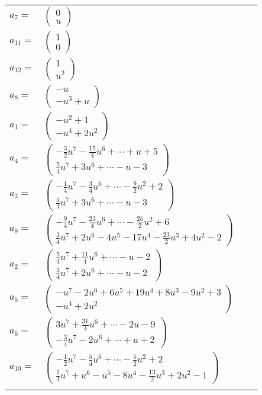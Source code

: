 \documentclass[1p]{elsarticle_modified}
\theoremstyle{definition}
\begin{document}
\begin{tabular}{m{7pt} m{180pt} m{7pt} m{180pt} }
\flushright $a_{7}=$&$\begin{pmatrix}0\\u\end{pmatrix}$ \\
\flushright $a_{11}=$&$\begin{pmatrix}1\\0\end{pmatrix}$ \\
\flushright $a_{12}=$&$\begin{pmatrix}1\\u^2\end{pmatrix}$ \\
\flushright $a_{8}=$&$\begin{pmatrix}- u\\- u^3+u\end{pmatrix}$ \\
\flushright $a_{1}=$&$\begin{pmatrix}- u^2+1\\- u^4+2 u^2\end{pmatrix}$ \\
\flushright $a_{4}=$&$\begin{pmatrix}-\frac{3}{2} u^7-\frac{15}{4} u^6+\cdots+u+5\\\frac{5}{4} u^7+3 u^6+\cdots- u-3\end{pmatrix}$ \\
\flushright $a_{3}=$&$\begin{pmatrix}-\frac{1}{4} u^7-\frac{3}{4} u^6+\cdots-\frac{9}{2} u^2+2\\\frac{5}{4} u^7+3 u^6+\cdots- u-3\end{pmatrix}$ \\
\flushright $a_{9}=$&$\begin{pmatrix}-\frac{9}{4} u^7-\frac{23}{4} u^6+\cdots-\frac{25}{2} u^2+6\\\frac{3}{4} u^7+2 u^6-4 u^5-17 u^4-\frac{23}{2} u^3+4 u^2-2\end{pmatrix}$ \\
\flushright $a_{2}=$&$\begin{pmatrix}\frac{5}{4} u^7+\frac{11}{4} u^6+\cdots- u-2\\\frac{3}{4} u^7+2 u^6+\cdots- u-2\end{pmatrix}$ \\
\flushright $a_{5}=$&$\begin{pmatrix}- u^7-2 u^6+6 u^5+19 u^4+8 u^3-9 u^2+3\\- u^4+2 u^2\end{pmatrix}$ \\
\flushright $a_{6}=$&$\begin{pmatrix}3 u^7+\frac{31}{4} u^6+\cdots-2 u-9\\-\frac{3}{4} u^7-2 u^6+\cdots+u+2\end{pmatrix}$ \\
\flushright $a_{10}=$&$\begin{pmatrix}-\frac{1}{2} u^7-\frac{5}{4} u^6+\cdots-\frac{5}{2} u^2+2\\\frac{1}{4} u^7+u^6- u^5-8 u^4-\frac{13}{2} u^3+2 u^2-1\end{pmatrix}$\\&\end{tabular}
\end{document}
